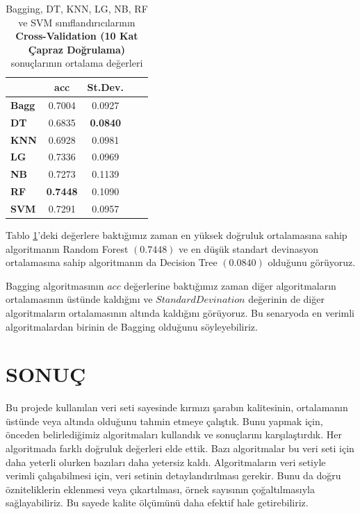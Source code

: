 \documentclass[conference]{IEEEtran}
\begin{document}
\begin{table}[h]
	\centering
	\normalsize
	\begin{tabular}{|l|c|c|c|c|}
		\hline
					& \textbf{acc}		& \textbf{St.Dev.}		\\ \hline
		\textbf{Bagg}	& 0.7004			& 0.0927			\\ \hline
		\textbf{DT}		& 0.6835			& \textbf{0.0840}		\\ \hline
		\textbf{KNN}	& 0.6928			& 0.0981 			\\ \hline
		\textbf{LG}		& 0.7336			& 0.0969			\\ \hline
		\textbf{NB}		& 0.7273			& 0.1139			\\ \hline
		\textbf{RF}		& \textbf{0.7448}		& 0.1090			\\ \hline
		\textbf{SVM}	& 0.7291			& 0.0957			\\ \hline
	\end{tabular}
	\caption{Bagging, DT, KNN, LG, NB, RF ve SVM sınıflandırıcılarının \textbf{Cross-Validation (10 Kat Çapraz Doğrulama)} sonuçlarının ortalama değerleri}
	\label{tbl:02}
\end{table}

\quad Tablo \ref{tbl:02}'deki değerlere baktığımız zaman en yüksek doğruluk ortalamasına sahip algoritmanın Random Forest $(0.7448)$ ve en düşük standart devinasyon ortalamasına sahip algoritmanın da Decision Tree $(0.0840)$ olduğunu görüyoruz.

\quad Bagging algoritmasının $acc$ değerlerine baktığımız zaman diğer algoritmaların ortalamasının üstünde kaldığını ve $StandardDevination$ değerinin de diğer algoritmaların ortalamasının altında kaldığını görüyoruz. Bu senaryoda en verimli algoritmalardan birinin de Bagging olduğunu söyleyebiliriz.


\newpage
\section{\textbf{SONUÇ}}
\quad Bu projede kullanılan veri seti sayesinde kırmızı şarabın kalitesinin, ortalamanın üstünde veya altında olduğunu tahmin etmeye çalıştık. Bunu yapmak için, önceden belirlediğimiz algoritmaları kullandık ve sonuçlarını karşılaştırdık. Her algoritmada farklı doğruluk değerleri elde ettik. Bazı algoritmalar bu veri seti için daha yeterli olurken bazıları daha yetersiz kaldı. Algoritmaların veri setiyle verimli çalışabilmesi için, veri setinin detaylandırılması gerekir. Bunu da doğru özniteliklerin eklenmesi veya çıkartılması, örnek sayısının çoğaltılmasıyla sağlayabiliriz. Bu sayede kalite ölçümünü daha efektif hale getirebiliriz.
\end{document}
